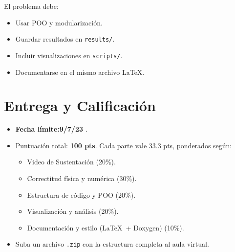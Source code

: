 \documentclass[11pt]{article}
\begin{document}
El problema debe:
\begin{itemize}
  \item Usar POO y modularización.
  \item Guardar resultados en \texttt{results/}.
  \item Incluir visualizaciones en \texttt{scripts/}.
  \item Documentarse en el mismo archivo \LaTeX.
\end{itemize}

\section*{Entrega y Calificación}
\begin{itemize}
  \item \textbf{Fecha límite:9/7/23} .
  \item Puntuación total: \textbf{100 pts}.  Cada parte vale 33.3 pts, ponderados según:
    \begin{itemize}
      \item Video de Sustentación  (20\%).  
      \item Correctitud física y numérica (30\%).
      \item Estructura de código y POO (20\%).
      \item Visualización y análisis (20\%).
      \item Documentación y estilo (\LaTeX\ + Doxygen) (10\%).
    \end{itemize}
  \item Suba un archivo \texttt{.zip} con la estructura completa al aula virtual.
\end{itemize}
\end{document}
